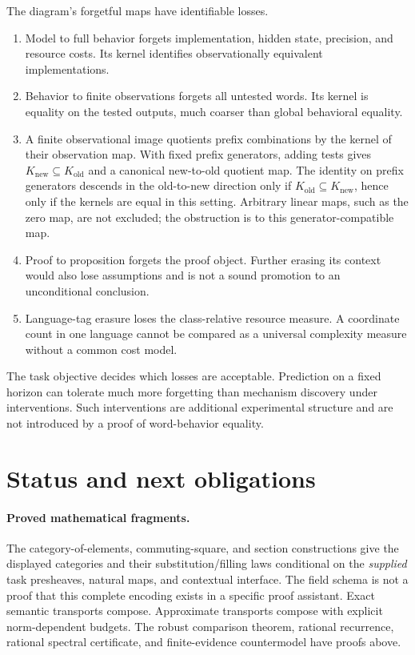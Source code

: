 \documentclass[11pt]{article}
\begin{document}
The diagram's forgetful maps have identifiable losses.
\begin{enumerate}
\item Model to full behavior forgets implementation, hidden state,
      precision, and resource costs. Its kernel identifies observationally
      equivalent implementations.
\item Behavior to finite observations forgets all untested words. Its
      kernel is equality on the tested outputs, much coarser than global
      behavioral equality.
\item A finite observational image quotients prefix combinations by
      the kernel of their observation map. With fixed prefix generators,
      adding tests gives $K_{\mathrm{new}}\subseteq K_{\mathrm{old}}$
      and a canonical new-to-old quotient map. The identity on prefix
      generators descends in the old-to-new direction only if
      $K_{\mathrm{old}}\subseteq K_{\mathrm{new}}$, hence only if the
      kernels are equal in this setting. Arbitrary linear maps, such as
      the zero map, are not excluded; the obstruction is to this
      generator-compatible map.
\item Proof to proposition forgets the proof object. Further erasing
      its context would also lose assumptions and is not a sound
      promotion to an unconditional conclusion.
\item Language-tag erasure loses the class-relative resource measure.
      A coordinate count in one language cannot be compared as a universal
      complexity measure without a common cost model.
\end{enumerate}
The task objective decides which losses are acceptable. Prediction on a
fixed horizon can tolerate much more forgetting than mechanism discovery
under interventions. Such interventions are additional experimental
structure and are not introduced by a proof of word-behavior equality.

\section{Status and next obligations}

\paragraph{Proved mathematical fragments.}
The category-of-elements, commuting-square, and section constructions
give the displayed categories and their substitution/filling laws
conditional on the \emph{supplied} task presheaves, natural maps, and
contextual interface. The field schema is not a proof that this complete
encoding exists in a specific proof assistant. Exact semantic transports compose.
Approximate transports compose with explicit norm-dependent budgets.
The robust comparison theorem, rational recurrence, rational spectral
certificate, and finite-evidence countermodel have proofs above.
\end{document}
